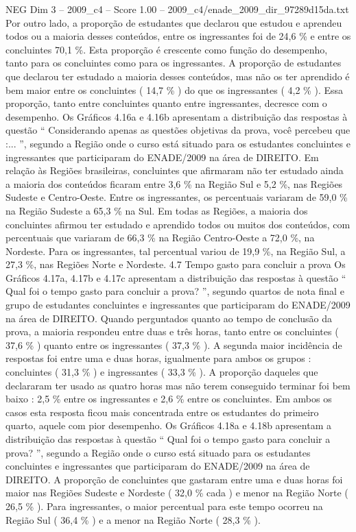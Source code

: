 \begin{textsample}{NEG Dim 3 – 2009\_c4 – Score 1.00 – 2009\_c4/enade\_2009\_dir\_97289d15da.txt}
Por outro lado, a proporção de estudantes que declarou que estudou e aprendeu todos ou a maioria desses conteúdos, entre os ingressantes foi de 24,6 \% e entre os concluintes 70,1 \%.
Esta proporção é crescente como função do desempenho, tanto para os concluintes como para os ingressantes.
A proporção de estudantes que declarou ter estudado a maioria desses conteúdos, mas não os ter aprendido é bem maior entre os concluintes ( 14,7 \% ) do que os ingressantes ( 4,2 \% ).
Essa proporção, tanto entre concluintes quanto entre ingressantes, decresce com o desempenho.
Os Gráficos 4.16a e 4.16b apresentam a distribuição das respostas à questão “ Considerando apenas as questões objetivas da prova, você percebeu que :... ”, segundo a Região onde o curso está situado para os estudantes concluintes e ingressantes que participaram do ENADE/2009 na área de DIREITO.
Em relação às Regiões brasileiras, concluintes que afirmaram não ter estudado ainda a maioria dos conteúdos ficaram entre 3,6 \% na Região Sul e 5,2 \%, nas Regiões Sudeste e Centro-Oeste.
Entre os ingressantes, os percentuais variaram de 59,0 \% na Região Sudeste a 65,3 \% na Sul.
Em todas as Regiões, a maioria dos concluintes afirmou ter estudado e aprendido todos ou muitos dos conteúdos, com percentuais que variaram de 66,3 \% na Região Centro-Oeste a 72,0 \%, na Nordeste.
Para os ingressantes, tal percentual variou de 19,9 \%, na Região Sul, a 27,3 \%, nas Regiões Norte e Nordeste. 4.7 Tempo gasto para concluir a prova Os Gráficos 4.17a, 4.17b e 4.17c apresentam a distribuição das respostas à questão “ Qual foi o tempo gasto para concluir a prova? ”, segundo quartos de nota final e grupo de estudantes concluintes e ingressantes que participaram do ENADE/2009 na área de DIREITO.
Quando perguntados quanto ao tempo de conclusão da prova, a maioria respondeu entre duas e três horas, tanto entre os concluintes ( 37,6 \% ) quanto entre os ingressantes ( 37,3 \% ).
A segunda maior incidência de respostas foi entre uma e duas horas, igualmente para ambos os grupos : concluintes ( 31,3 \% ) e ingressantes ( 33,3 \% ).
A proporção daqueles que declararam ter usado as quatro horas mas não terem conseguido terminar foi bem baixo : 2,5 \% entre os ingressantes e 2,6 \% entre os concluintes.
Em ambos os casos esta resposta ficou mais concentrada entre os estudantes do primeiro quarto, aquele com pior desempenho.
Os Gráficos 4.18a e 4.18b apresentam a distribuição das respostas à questão “ Qual foi o tempo gasto para concluir a prova? ”, segundo a Região onde o curso está situado para os estudantes concluintes e ingressantes que participaram do ENADE/2009 na área de DIREITO.
A proporção de concluintes que gastaram entre uma e duas horas foi maior nas Regiões Sudeste e Nordeste ( 32,0 \% cada ) e menor na Região Norte ( 26,5 \% ).
Para ingressantes, o maior percentual para este tempo ocorreu na Região Sul ( 36,4 \% ) e a menor na Região Norte ( 28,3 \% ).

\end{textsample}
